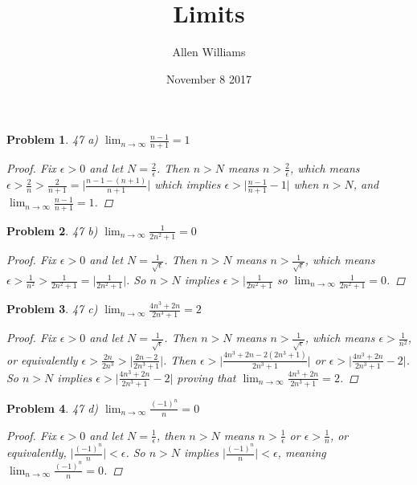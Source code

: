 \documentclass{article}
\title{Limits}
\author{Allen Williams }
\date{November 8 2017}
\newtheorem*{Problem}{Problem}
\begin{document}
\maketitle
 
 \begin{Problem}
  47 a) $\lim_{n\to\infty}\frac{n-1}{n+1}=1$
  \begin{proof}
      Fix $\epsilon>0$ and let $N=\frac{2}{\epsilon}$.  Then $n>N$ means $n>\frac{2}{\epsilon}$, which means $\epsilon>\frac{2}{n}>\frac{2}{n+1}=\lvert\frac{n-1-(n+1)}{n+1}\rvert$ which implies $\epsilon>\lvert\frac{n-1}{n+1}-1\rvert$ when $n>N$, and $\lim_{n\to\infty}\frac{n-1}{n+1}=1$.
  \end{proof}
 \end{Problem}
 
  \begin{Problem}
  47 b) $\lim_{n\to\infty}\frac{1}{2n^2+1}=0$
  \begin{proof}
      Fix $\epsilon>0$ and let $N=\frac{1}{\sqrt{\epsilon}}$.  Then $n>N$ means $n>\frac{1}{\sqrt{\epsilon}}$, which means $\epsilon>\frac{1}{n^2}>\frac{1}{2n^2+1}=\lvert\frac{1}{2n^2+1}\rvert$. So $n>N$ implies $\epsilon>\lvert\frac{1}{2n^2+1}$ so $\lim_{n\to\infty}\frac{1}{2n^2+1}=0$.
  \end{proof}
 \end{Problem}
 
  \begin{Problem}
  47 c) $\lim_{n\to\infty}\frac{4n^3+2n}{2n^3+1}=2$
  \begin{proof}
      Fix $\epsilon>0$ and let $N=\frac{1}{\sqrt{\epsilon}}$.  Then $n>N$ means $n>\frac{1}{\sqrt{\epsilon}}$, which means $\epsilon>\frac{1}{n^2}$, or equivalently $\epsilon>\frac{2n}{2n^3}>\lvert\frac{2n-2}{2n^3+1}\rvert$. Then $\epsilon>\lvert\frac{4n^3+2n-2(2n^3+1)}{2n^3+1}\rvert$ or $\epsilon>\lvert\frac{4n^3+2n}{2n^3+1}-2\rvert$. So $n>N$ implies $\epsilon>\lvert\frac{4n^3+2n}{2n^3+1}-2\rvert$ proving that $\lim_{n\to\infty}\frac{4n^3+2n}{2n^3+1}=2$.
  \end{proof}
 \end{Problem}
 
   \begin{Problem}
  47 d) $\lim_{n\to\infty}\frac{(-1)^n}{n}=0$
  \begin{proof}
      Fix $\epsilon>0$ and let $N=\frac{1}{\epsilon}$, then $n>N$ means $n>\frac{1}{\epsilon}$ or $\epsilon>\frac{1}{n}$, or equivalently, $\lvert\frac{(-1)^n}{n}\rvert<\epsilon$. So $n>N$ implies $\lvert\frac{(-1)^n}{n}\rvert<\epsilon$, meaning $\lim_{n\to\infty}\frac{(-1)^n}{n}=0$.
  \end{proof}
 \end{Problem}
 
\end{document}

